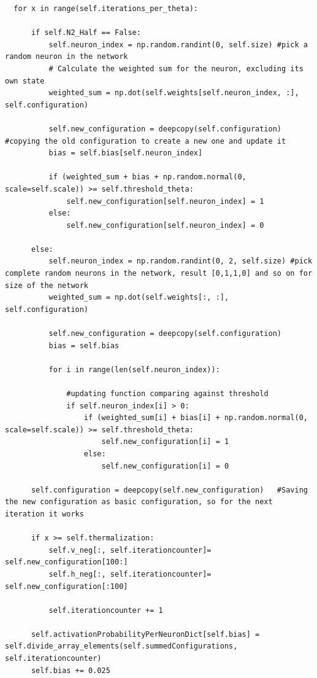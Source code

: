 \label{attachement:HNN_N/2Half Code}
\begin{lstlisting}
  for x in range(self.iterations_per_theta):
              
      if self.N2_Half == False:
          self.neuron_index = np.random.randint(0, self.size) #pick a random neuron in the network
          # Calculate the weighted sum for the neuron, excluding its own state
          weighted_sum = np.dot(self.weights[self.neuron_index, :], self.configuration)               
  
          self.new_configuration = deepcopy(self.configuration)   #copying the old configuration to create a new one and update it
          bias = self.bias[self.neuron_index]
  
          if (weighted_sum + bias + np.random.normal(0, scale=self.scale)) >= self.threshold_theta:           
              self.new_configuration[self.neuron_index] = 1
          else:
              self.new_configuration[self.neuron_index] = 0
  
      else: 
          self.neuron_index = np.random.randint(0, 2, self.size) #pick complete random neurons in the network, result [0,1,1,0] and so on for size of the network
          weighted_sum = np.dot(self.weights[:, :], self.configuration)   
  
          self.new_configuration = deepcopy(self.configuration)
          bias = self.bias 
  
          for i in range(len(self.neuron_index)):
              
              #updating function comparing against threshold
              if self.neuron_index[i] > 0:
                  if (weighted_sum[i] + bias[i] + np.random.normal(0, scale=self.scale)) >= self.threshold_theta:          
                      self.new_configuration[i] = 1
                  else:
                      self.new_configuration[i] = 0
  
      self.configuration = deepcopy(self.new_configuration)   #Saving the new configuration as basic configuration, so for the next iteration it works
  
      if x >= self.thermalization:  
          self.v_neg[:, self.iterationcounter]= self.new_configuration[100:]
          self.h_neg[:, self.iterationcounter]= self.new_configuration[:100]
  
          self.iterationcounter += 1
  
      self.activationProbabilityPerNeuronDict[self.bias] = self.divide_array_elements(self.summedConfigurations, self.iterationcounter)
      self.bias += 0.025
  \end{lstlisting}